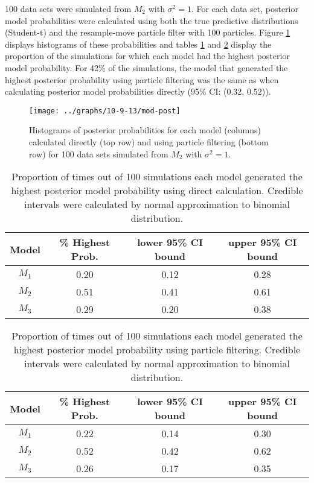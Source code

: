 \documentclass{article}
\begin{document}
100 data sets were simulated from $M_2$ with $\sigma^2 = 1$. For each data set, posterior model probabilities were calculated using both the true predictive distributions (Student-t) and the resample-move particle filter with 100 particles. Figure \ref{fig:probhist} displays histograms of these probabilities and tables \ref{tab:true.propbestmod} and \ref{tab:pf.propbestmod} display the proportion of the simulations for which each model had the highest posterior model probability. For 42\% of the simulations, the model that generated the highest posterior probability using particle filtering was the same as when calculating posterior model probabilities directly (95\% CI: (0.32, 0.52)).

\clearpage

\begin{figure}
\texttt{[image: ../graphs/10-9-13/mod-post]}
\caption{Histograms of posterior probabilities for each model (columns) calculated directly (top row) and using particle filtering (bottom row) for 100 data sets simulated from $M_2$ with $\sigma^2 = 1$.} \label{fig:probhist}
\end{figure}

\begin{table}
\begin{center}
\caption{Proportion of times out of 100 simulations each model generated the highest posterior model probability using direct calculation. Credible intervals were calculated by normal approximation to binomial distribution.} \label{tab:true.propbestmod}
\begin{tabular}{|c|c|c|c|}
\hline
 Model & \% Highest Prob. & lower 95\% CI bound & upper 95\% CI bound \\
 \hline
 $M_1$ & 0.20 & 0.12 & 0.28 \\
 $M_2$ & 0.51 & 0.41 & 0.61 \\
 $M_3$ & 0.29 & 0.20 & 0.38 \\
 \hline
\end{tabular}
\end{center}
\end{table}

\begin{table}
\begin{center}
\caption{Proportion of times out of 100 simulations each model generated the highest posterior model probability using particle filtering. Credible intervals were calculated by normal approximation to binomial distribution.} \label{tab:pf.propbestmod}
\begin{tabular}{|c|c|c|c|}
\hline
 Model & \% Highest Prob. & lower 95\% CI bound & upper 95\% CI bound \\
 \hline
 $M_1$ & 0.22 & 0.14 & 0.30 \\
 $M_2$ & 0.52 & 0.42 & 0.62 \\
 $M_3$ & 0.26 & 0.17 & 0.35 \\
 \hline
\end{tabular}
\end{center}
\end{table}
\end{document}
